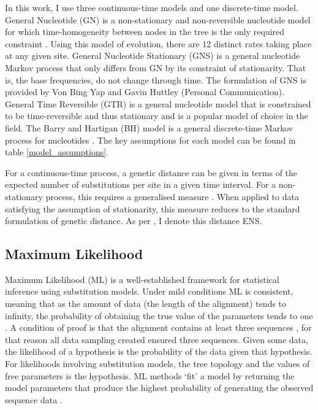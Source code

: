 In this work, I use three continuous-time models and one discrete-time model. General Nucleotide (GN) is a non-stationary and non-reversible nucleotide model for which time-homogeneity between nodes in the tree is the only required constraint \citep{Kaehler2015}. Using this model of evolution, there are 12 distinct rates taking place at any given site. General Nucleotide Stationary (GNS) is a general nucleotide Markov process that only differs from GN by its constraint of stationarity. That is, the base frequencies, do not change through time. The formulation of GNS is provided by Von Bing Yap and Gavin Huttley (Personal Communication). General Time Reversible (GTR) is a general nucleotide model that is constrained to be time-reversible and thus stationary \citep{Lanave1984ARates} and is a popular model of choice in the field. The Barry and Hartigan (BH) model is a general discrete-time Markov process for nucleotides \citep{Barry1987StatisticalEvolution}. The key assumptions for each model can be found in table \ref{model_assumptions}.



For a continuous-time process, a genetic distance can be given in terms of the expected number of substitutions per site in a given time interval. For a non-stationary process, this requires a generalised measure \citep{Kaehler2015}. When applied to data satisfying the assumption of stationarity, this measure reduces to the standard formulation of genetic distance. As per \cite{Kaehler2015}, I denote this distance ENS. 


\subsection{Maximum Likelihood}

Maximum Likelihood (ML) is a well-established framework for statistical inference using substitution models. Under mild conditions ML is consistent, meaning that as the amount of data (the length of the alignment) tends to infinity, the probability of obtaining the true value of the parameters tends to one \citep{Chang1996FullConsistency}. A condition of proof is that the alignment contains at least three sequences \citep{Chang1996FullConsistency}, for that reason all data sampling created ensured three sequences. Given some data, the likelihood of a hypothesis is the probability of the data given that hypothesis. For likelihoods involving substitution models, the tree topology and the values of free parameters is the hypothesis. ML methods `fit' a model by returning the model parameters that produce the highest probability of generating the observed sequence data \citep{Felsenstein1981EvolutionaryApproach}.

